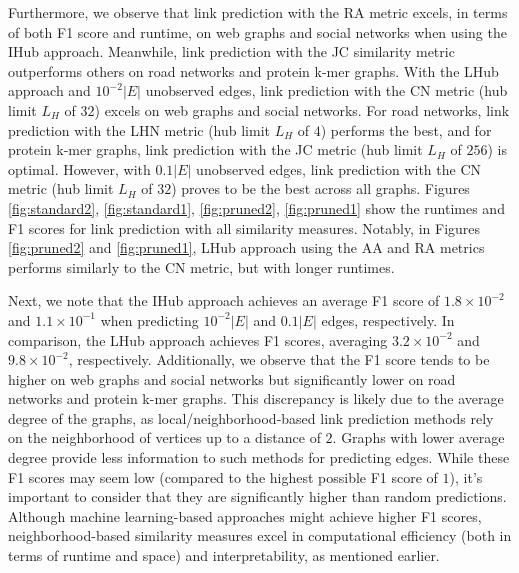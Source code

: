 Furthermore, we observe that link prediction with the RA metric excels, in terms of both F1 score and runtime, on web graphs and social networks when using the IHub approach. Meanwhile, link prediction with the JC similarity metric outperforms others on road networks and protein k-mer graphs. With the LHub approach and $10^{-2}|E|$ unobserved edges, link prediction with the CN metric (hub limit $L_H$ of $32$) excels on web graphs and social networks. For road networks, link prediction with the LHN metric (hub limit $L_H$ of $4$) performs the best, and for protein k-mer graphs, link prediction with the JC metric (hub limit $L_H$ of $256$) is optimal. However, with $0.1|E|$ unobserved edges, link prediction with the CN metric (hub limit $L_H$ of $32$) proves to be the best across all graphs. Figures \ref{fig:standard2}, \ref{fig:standard1}, \ref{fig:pruned2}, \ref{fig:pruned1} show the runtimes and F1 scores for link prediction with all similarity measures. Notably, in Figures \ref{fig:pruned2} and \ref{fig:pruned1}, LHub approach using the AA and RA metrics performs similarly to the CN metric, but with longer runtimes.

Next, we note that the IHub approach achieves an average F1 score of $1.8\times10^{-2}$ and $1.1\times10^{-1}$ when predicting $10^{-2}|E|$ and $0.1|E|$ edges, respectively. In comparison, the LHub approach achieves F1 scores, averaging $3.2\times10^{-2}$ and $9.8\times10^{-2}$, respectively. Additionally, we observe that the F1 score tends to be higher on web graphs and social networks but significantly lower on road networks and protein k-mer graphs. This discrepancy is likely due to the average degree of the graphs, as local/neighborhood-based link prediction methods rely on the neighborhood of vertices up to a distance of $2$. Graphs with lower average degree provide less information to such methods for predicting edges. While these F1 scores may seem low (compared to the highest possible F1 score of $1$), it's important to consider that they are significantly higher than random predictions. Although machine learning-based approaches might achieve higher F1 scores, neighborhood-based similarity measures excel in computational efficiency (both in terms of runtime and space) and interpretability, as mentioned earlier.





